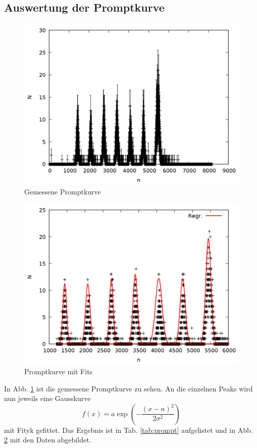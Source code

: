 \subsection{Auswertung der Promptkurve}

\begin{figure}
\centering
\includegraphics[width=0.7\linewidth]{data/prompt.png}
\caption{Gemessene Promptkurve}
\label{fig:prompt}
\end{figure}

\begin{figure}
\centering
\includegraphics[width=0.7\linewidth]{data/prompt2.png}
\caption{Promptkurve mit Fits}
\label{fig:prompt2}
\end{figure}

In Abb. \ref{fig:prompt} ist die gemessene Promptkurve zu sehen. An die einzelnen Peaks wird nun jeweils eine Gausskurve \[f(x) = a\exp{\left(-\frac{(x-n)^2}{2\sigma^2}\right)}\]mit Fityk gefittet. Das Ergebnis ist in Tab. \ref{tab:prompt} aufgelistet und in Abb. \ref{fig:prompt2} mit den Daten abgebildet.

